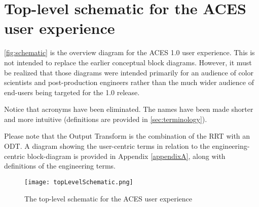 \numberedformat
\chapter{Top-level schematic for the ACES user experience}

\autoref{fig:schematic} is the overview diagram for the ACES 1.0 user experience. This is not intended to replace the earlier conceptual block diagrams. However, it must be realized that those diagrams were intended primarily for an audience of color scientists and post-production engineers rather than the much wider audience of end-users being targeted for the 1.0 release.

Notice that acronyms have been eliminated. The names have been made shorter and more intuitive (definitions are provided in \autoref{sec:terminology}).

Please note that the Output Transform is the combination of the RRT with an ODT. A diagram showing the user-centric terms in relation to the engineering-centric block-diagram is provided in Appendix \ref{appendixA}, along with definitions of the engineering terms.

\begin{figure}[htbp]
\begin{center}
    \texttt{[image: topLevelSchematic.png]}
\caption{The top-level schematic for the ACES user experience}
\label{fig:schematic}
\end{center}
\end{figure}
